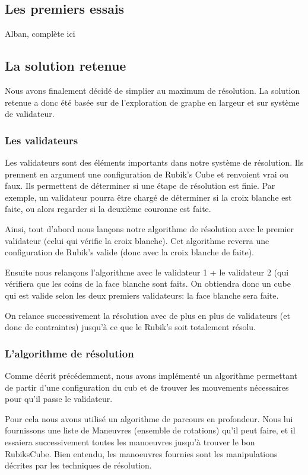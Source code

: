 \subsection{Les premiers essais}
Alban, complète ici

\subsection{La solution retenue}
Nous avons finalement décidé de simplier au maximum de résolution.
La solution retenue a donc été basée sur de l'exploration de graphe en largeur et sur système de validateur.

\subsubsection{Les validateurs}
Les validateurs sont des éléments importants dans notre système de résolution.
Ils prennent en argument une configuration de Rubik's Cube et renvoient vrai ou faux.
Ils permettent de déterminer si une étape de résolution est finie.
Par exemple, un validateur pourra être chargé de déterminer si la croix blanche est faite, ou alors regarder si la deuxième couronne est faite.

Ainsi, tout d'abord nous lançons notre algorithme de résolution avec le premier validateur (celui qui vérifie la croix blanche).
Cet algorithme reverra une configuration de Rubik's valide (donc avec la croix blanche de faite).

Ensuite nous relançons l'algorithme avec le validateur 1 + le validateur 2 (qui vérifiera que les coins de la face blanche sont faits.
On obtiendra donc un cube qui est valide selon les deux premiers validateurs: la face blanche sera faite.

On relance successivement la résolution avec de plus en plus de validateurs (et donc de contraintes) jusqu'à ce que le Rubik's soit totalement résolu.

\subsubsection{L'algorithme de résolution}
Comme décrit précédemment, nous avons implémenté un algorithme permettant de partir d'une configuration du cub et de trouver les mouvements nécessaires pour qu'il passe le validateur.

Pour cela nous avons utilisé un algorithme de parcours en profondeur.
Nous lui fournissons une liste de Maneuvres (ensemble de rotations) qu'il peut faire, et il essaiera successivement toutes les manoeuvres jusqu'à trouver le bon RubiksCube.
Bien entendu, les manoeuvres fournies sont les manipulations décrites par les techniques de résolution.

